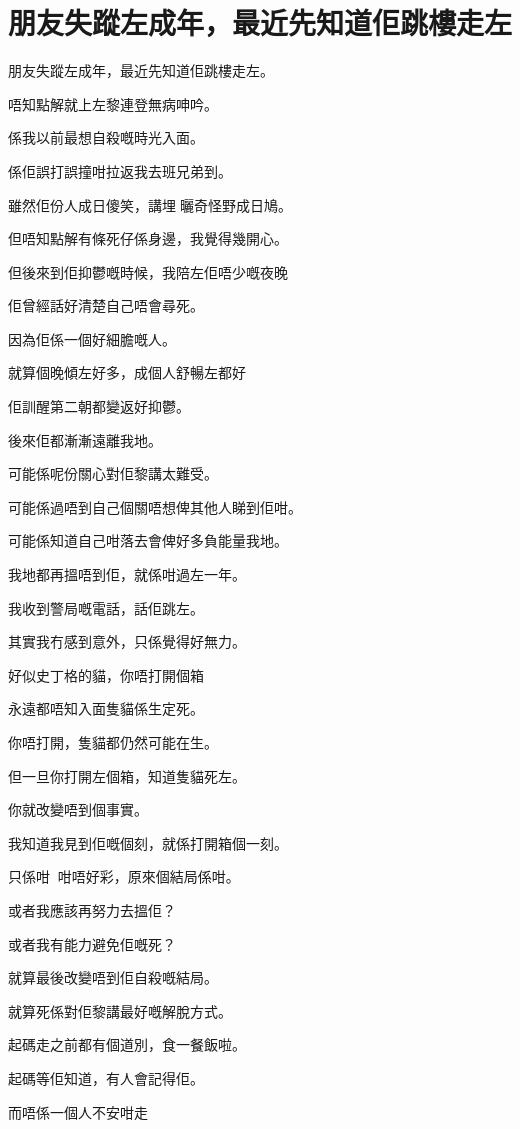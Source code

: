 \chapter{朋友失蹤左成年，最近先知道佢跳樓走左}

朋友失蹤左成年，最近先知道佢跳樓走左。

唔知點解就上左黎連登無病呻吟。

係我以前最想自殺嘅時光入面。

係佢誤打誤撞咁拉返我去班兄弟到。

雖然佢份人成日傻笑，講埋曬奇怪野成日鳩。

但唔知點解有條死仔係身邊，我覺得幾開心。

但後來到佢抑鬱嘅時候，我陪左佢唔少嘅夜晚

佢曾經話好清楚自己唔會尋死。

因為佢係一個好細膽嘅人。

就算個晚傾左好多，成個人舒暢左都好

佢訓醒第二朝都變返好抑鬱。

後來佢都漸漸遠離我地。

可能係呢份關心對佢黎講太難受。

可能係過唔到自己個關唔想俾其他人睇到佢咁。

可能係知道自己咁落去會俾好多負能量我地。

我地都再搵唔到佢，就係咁過左一年。

我收到警局嘅電話，話佢跳左。

其實我冇感到意外，只係覺得好無力。

好似史丁格的貓，你唔打開個箱    

永遠都唔知入面隻貓係生定死。

你唔打開，隻貓都仍然可能在生。

但一旦你打開左個箱，知道隻貓死左。

你就改變唔到個事實。

我知道我見到佢嘅個刻，就係打開箱個一刻。

只係咁，咁唔好彩，原來個結局係咁。
    
或者我應該再努力去搵佢？

或者我有能力避免佢嘅死？

就算最後改變唔到佢自殺嘅結局。

就算死係對佢黎講最好嘅解脫方式。

起碼走之前都有個道別，食一餐飯啦。

起碼等佢知道，有人會記得佢。

而唔係一個人不安咁走    

